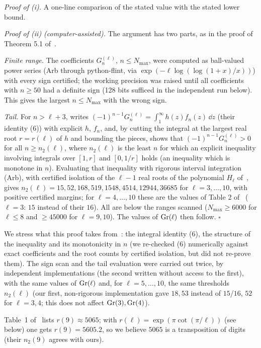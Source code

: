 \noindent\emph{Proof of (i).} A one-line comparison of the stated value with the stated lower bound.

\noindent\emph{Proof of (ii) (computer-assisted).} The argument has two parts, as in the proof of Theorem 5.1 of~\cite{XZ}.

\emph{Finite range.} The coefficients $G_n^{(\ell)}$, $n\le N_{\max}$, were computed as ball-valued power series (Arb through python-flint, via $\exp(-\ell\log(\log(1+x)/x))$) with every sign certified; the working precision was raised until all coefficients with $n\ge50$ had a definite sign (128 bits sufficed in the independent run below). This gives the largest $n\le N_{\max}$ with the wrong sign.

\emph{Tail.} For $n>\ell+3$, \cite{XZ} writes $(-1)^{n-1}G_n^{(\ell)}=\int_1^\infty h(z)f_n(z)\,\dd z$ (their identity (6)) with explicit $h$, $f_n$, and, by cutting the integral at the largest real root $r=r(\ell)$ of $h$ and bounding the pieces, shows that $(-1)^{n-1}G^{(\ell)}_n>0$ for all $n\ge n_2(\ell)$, where $n_2(\ell)$ is the least $n$ for which an explicit inequality involving integrals over $[1,r]$ and $[0,1/r]$ holds (an inequality which is monotone in $n$). Evaluating that inequality with rigorous interval integration (Arb), with certified isolation of the $\ell-1$ real roots of the polynomial $H_\ell$ of~\cite{XZ}, gives $n_2(\ell)=15,52,168,519,1548,4514,12944,36685$ for $\ell=3,\dots,10$, with positive certified margins; for $\ell=4,\dots,10$ these are the values of Table 2 of~\cite{XZ} ($\ell=3$: $15$ instead of their $16$). All are below the ranges scanned ($N_{\max}\ge6000$ for $\ell\le8$ and $\ge45000$ for $\ell=9,10$). The values of $\mathrm{Gr}(\ell)$ then follow. \hfill$\square$

\smallskip
We stress what this proof takes from~\cite{XZ}: the integral identity (6), the structure of the inequality and its monotonicity in $n$ (we re-checked (6) numerically against exact coefficients and the root counts by certified isolation, but did not re-prove them). The sign scan and the tail evaluation were carried out twice, by independent implementations (the second written without access to the first), with the same values of $\mathrm{Gr}(\ell)$ and, for $\ell=5,\dots,10$, the same thresholds $n_2(\ell)$ (our first, non-rigorous implementation gave $18,53$ instead of $15$/$16$, $52$ for $\ell=3,4$; this does not affect $\mathrm{Gr}(3),\mathrm{Gr}(4)$).

\begin{remark}
Table~1 of~\cite{XZ} lists $r(9)\approx5065$; with $r(\ell)=\exp(\pi\cot(\pi/\ell))$ (see below) one gets $r(9)=5605.2$, so we believe $5065$ is a transposition of digits (their $n_2(9)$ agrees with ours).
\end{remark}

